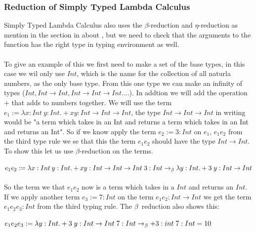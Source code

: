 \subsubsection{Reduction of Simply Typed Lambda Calculus}
Simply Typed Lambda Calculus also uses the $\beta$-reduction and $\eta$-reduction as mention in the 
section in about , but we need to check that the arguments to the function has 
the right type in typing environment as well. 
\\ \\
To give an example of this we first need to make a set of the base types, in this case we wil only use $Int$, which is the name for the collection of all 
naturla numbers, as the only base type. From this one type we can make an infinity of types ($Int, Int \rightarrow Int, Int \rightarrow Int \rightarrow Int ....$).
In addtion we will add the operation $+$ that adds to numbers together.
We will use the term $e_1:= \lambda x:Int\: y:Int. + x y:Int \rightarrow Int \rightarrow Int$, the type $Int \rightarrow Int \rightarrow Int$ in writing would be "a term
which takes in an Int and returns a term which takes in an Int and returns an Int". 
So if we know apply the term $e_2 := 3:Int$ on $e_1$, $e_1 e_2$ from the third type rule we se that this the term 
$e_1 e_2$ should have the type $Int \rightarrow Int$. To show this let us use $\beta$-reduction on the terms.
\\ \\
$e_1 e_2 := \lambda x:Int\: y:Int. + x y:Int \rightarrow Int \rightarrow Int\; 3:Int 
\newline\rightarrow_\beta \lambda y:Int. + 3\; y: Int \rightarrow Int$
\\ \\
So the term we that $e_1 e_2 $ now is a term which takes in a $Int$ and returns an $Int$. If we apply another term
$e_3 := 7:Int$ on the term $e_1 e_2:Int \rightarrow Int$ we get the term $e_1 e_2 e_3:Int$ from the third typing rule.
The $\beta$ reduction also shows this: 
\\ \\
$e_1 e_2 e_3 := \lambda y:Int. + 3\; y: Int \rightarrow Int \; 7:Int
\newline \rightarrow_\beta + 3:int \; 7:Int = 10$

